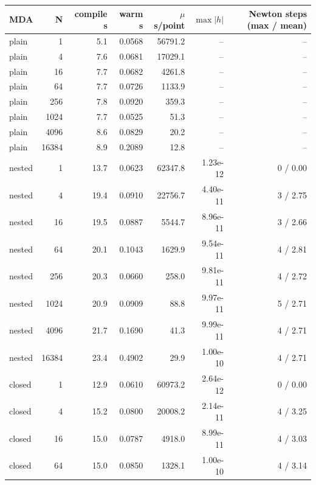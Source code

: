 \begin{tabular}{lrrrrrr}
\toprule
MDA & N & compile s & warm s & $\mu$s/point & $\max|h|$ & Newton steps (max / mean) \\
\midrule
plain & 1 & 5.1 & 0.0568 & 56791.2 & -- & -- \\
plain & 4 & 7.6 & 0.0681 & 17029.1 & -- & -- \\
plain & 16 & 7.7 & 0.0682 & 4261.8 & -- & -- \\
plain & 64 & 7.7 & 0.0726 & 1133.9 & -- & -- \\
plain & 256 & 7.8 & 0.0920 & 359.3 & -- & -- \\
plain & 1024 & 7.7 & 0.0525 & 51.3 & -- & -- \\
plain & 4096 & 8.6 & 0.0829 & 20.2 & -- & -- \\
plain & 16384 & 8.9 & 0.2089 & 12.8 & -- & -- \\
nested & 1 & 13.7 & 0.0623 & 62347.8 & 1.23e-12 & 0 / 0.00 \\
nested & 4 & 19.4 & 0.0910 & 22756.7 & 4.40e-11 & 3 / 2.75 \\
nested & 16 & 19.5 & 0.0887 & 5544.7 & 8.96e-11 & 3 / 2.66 \\
nested & 64 & 20.1 & 0.1043 & 1629.9 & 9.54e-11 & 4 / 2.81 \\
nested & 256 & 20.3 & 0.0660 & 258.0 & 9.81e-11 & 4 / 2.72 \\
nested & 1024 & 20.9 & 0.0909 & 88.8 & 9.97e-11 & 5 / 2.71 \\
nested & 4096 & 21.7 & 0.1690 & 41.3 & 9.99e-11 & 4 / 2.71 \\
nested & 16384 & 23.4 & 0.4902 & 29.9 & 1.00e-10 & 4 / 2.71 \\
closed & 1 & 12.9 & 0.0610 & 60973.2 & 2.64e-12 & 0 / 0.00 \\
closed & 4 & 15.2 & 0.0800 & 20008.2 & 2.14e-11 & 4 / 3.25 \\
closed & 16 & 15.0 & 0.0787 & 4918.0 & 8.99e-11 & 4 / 3.03 \\
closed & 64 & 15.0 & 0.0850 & 1328.1 & 1.00e-10 & 4 / 3.14 \\

\end{tabular}
